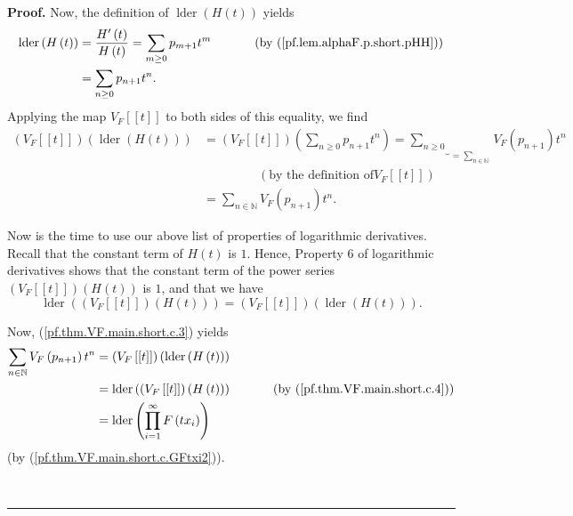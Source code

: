 \documentclass[numbers=enddot,12pt,final,onecolumn,notitlepage]{scrartcl}%
\theoremstyle{definition}
\newenvironment{proof}[1][Proof]{\noindent\textbf{#1.} }{\ \rule{0.5em}{0.5em}}
\let\sumnonlimits\sum
\let\prodnonlimits\prod
\renewcommand{\sum}{\sumnonlimits\limits}
\renewcommand{\prod}{\prodnonlimits\limits}
\newenvironment{vershort}{}{}
\begin{document}
\begin{vershort}
\begin{proof}
Now, the definition of $\operatorname*{lder}\left(  H\left(  t\right)
\right)  $ yields%
\begin{align*}
\operatorname*{lder}\left(  H\left(  t\right)  \right)   &  =\dfrac{H^{\prime
}\left(  t\right)  }{H\left(  t\right)  }=\sum_{m\geq0}p_{m+1}t^{m}%
\ \ \ \ \ \ \ \ \ \ \left(  \text{by (\ref{pf.lem.alphaF.p.short.pHH})}\right)
\\
&  =\sum_{n\geq0}p_{n+1}t^{n}.
\end{align*}
Applying the map $V_{F}\left[  \left[  t\right]  \right]  $ to both sides of
this equality, we find%
\begin{align}
\left(  V_{F}\left[  \left[  t\right]  \right]  \right)  \left(
\operatorname*{lder}\left(  H\left(  t\right)  \right)  \right)   &  =\left(
V_{F}\left[  \left[  t\right]  \right]  \right)  \left(  \sum_{n\geq0}%
p_{n+1}t^{n}\right)  =\underbrace{\sum_{n\geq0}}_{=\sum_{n\in\mathbb{N}}}%
V_{F}\left(  p_{n+1}\right)  t^{n}\nonumber\\
&  \ \ \ \ \ \ \ \ \ \ \ \ \ \ \ \ \ \ \ \ \left(  \text{by the definition of
}V_{F}\left[  \left[  t\right]  \right]  \right) \nonumber\\
&  =\sum_{n\in\mathbb{N}}V_{F}\left(  p_{n+1}\right)  t^{n}.
\label{pf.thm.VF.main.short.c.3}%
\end{align}


Now is the time to use our above list of properties of logarithmic
derivatives. Recall that the constant term of $H\left(  t\right)  $ is $1$.
Hence, Property 6 of logarithmic derivatives shows that the constant term of
the power series $\left(  V_{F}\left[  \left[  t\right]  \right]  \right)
\left(  H\left(  t\right)  \right)  $ is $1$, and that we have%
\begin{equation}
\operatorname*{lder}\left(  \left(  V_{F}\left[  \left[  t\right]  \right]
\right)  \left(  H\left(  t\right)  \right)  \right)  =\left(  V_{F}\left[
\left[  t\right]  \right]  \right)  \left(  \operatorname*{lder}\left(
H\left(  t\right)  \right)  \right)  . \label{pf.thm.VF.main.short.c.4}%
\end{equation}


Now, (\ref{pf.thm.VF.main.short.c.3}) yields%
\begin{align}
\sum_{n\in\mathbb{N}}V_{F}\left(  p_{n+1}\right)  t^{n}  &  =\left(
V_{F}\left[  \left[  t\right]  \right]  \right)  \left(  \operatorname*{lder}%
\left(  H\left(  t\right)  \right)  \right) \nonumber\\
&  =\operatorname*{lder}\left(  \left(  V_{F}\left[  \left[  t\right]
\right]  \right)  \left(  H\left(  t\right)  \right)  \right)
\ \ \ \ \ \ \ \ \ \ \left(  \text{by (\ref{pf.thm.VF.main.short.c.4})}\right)
\nonumber\\
&  =\operatorname*{lder}\left(  \prod_{i=1}^{\infty}F\left(  tx_{i}\right)
\right)  \label{pf.thm.VF.main.short.c.5}%
\end{align}
(by (\ref{pf.thm.VF.main.short.c.GFtxi2})).


\end{proof}
\end{vershort}
\end{document}
